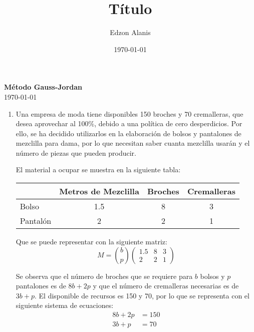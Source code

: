 \documentclass[12pt]{article}
\title{Título}
\author{Edzon Alanis}
\date{\today}
\begin{document}

\begin{center}
    \textbf{\Large Método Gauss-Jordan}\\[0.5cm]
    \today
\end{center}

\begin{enumerate}
    \item Una empresa de moda tiene disponibles 150 broches y 70 cremalleras, que desea aprovechar al 100\%, debido a una política de cero desperdicios. Por ello, se ha decidido utilizarlos en la elaboración de bolsos y pantalones de mezclilla para dama, por lo que necesitan saber cuanta mezclilla usarán y el número de piezas que pueden producir.
    
    El material a ocupar se muestra en la siguiente tabla: 
    \begin{table}[h]
        \centering
        \begin{tabular}{c|c|c|c|}
        \cline{2-4}
                                    & Metros de Mezclilla & Broches & Cremalleras \\ \hline
        \multicolumn{1}{|l|}{Bolso}    & 1.5                 & 8       & 3           \\ \hline
        \multicolumn{1}{|l|}{Pantalón} & 2                   & 2       & 1           \\ \hline
        \end{tabular}
    \end{table}

    Que se puede representar con la siguiente matriz:
    \[M = \binom{b}{p} \begin{pmatrix}
        1.5 & 8 & 3 \\
        2 & 2 & 1
    \end{pmatrix}\]

    Se observa que el número de broches que se requiere para $b$ bolsos y $p$ pantalones es de $8b+2p$ y que el número de cremalleras necesarias es de $3b+p$. El disponible de recursos es 150 y 70, por lo que se representa con el siguiente sistema de ecuaciones:
    \begin{align*}
        8b + 2p &= 150 \\
        3b + p &= 70
    \end{align*}


\end{enumerate}
\end{document}
